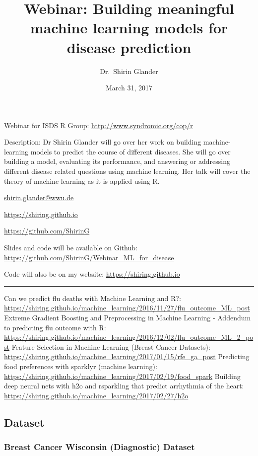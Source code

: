 \documentclass[]{article}
\title{Webinar: Building meaningful machine learning models for disease
prediction}
\author{Dr.~Shirin Glander}
\date{March 31, 2017}
\begin{document}
\maketitle

Webinar for ISDS R Group: \url{http://www.syndromic.org/cop/r}

Description: Dr Shirin Glander will go over her work on building
machine-learning models to predict the course of different diseases. She
will go over building a model, evaluating its performance, and answering
or addressing different disease related questions using machine
learning. Her talk will cover the theory of machine learning as it is
applied using R.

\href{mailto:shirin.glander@wwu.de}{shirin.glander@wwu.de}

\href{https://shiring.github.io}{https://shiring.github.io}

\href{https://github.com/ShirinG}{https://github.com/ShirinG}

Slides and code will be available on Github:
\href{https://github.com/ShirinG/Webinar_ML_for_disease}{https://github.com/ShirinG/Webinar\_ML\_for\_disease}

Code will also be on my website:
\href{https://shiring.github.io}{https://shiring.github.io}

\begin{center}\rule{0.5\linewidth}{\linethickness}\end{center}

Can we predict flu deaths with Machine Learning and R?:
\url{https://shiring.github.io/machine_learning/2016/11/27/flu_outcome_ML_post}
Extreme Gradient Boosting and Preprocessing in Machine Learning -
Addendum to predicting flu outcome with R:
\url{https://shiring.github.io/machine_learning/2016/12/02/flu_outcome_ML_2_post}
Feature Selection in Machine Learning (Breast Cancer Datasets):
\url{https://shiring.github.io/machine_learning/2017/01/15/rfe_ga_post}
Predicting food preferences with sparklyr (machine learning):
\url{https://shiring.github.io/machine_learning/2017/02/19/food_spark}
Building deep neural nets with h2o and rsparkling that predict
arrhythmia of the heart:
\url{https://shiring.github.io/machine_learning/2017/02/27/h2o}

\subsection{Dataset}\label{dataset}

\subsubsection{Breast Cancer Wisconsin (Diagnostic)
Dataset}\label{breast-cancer-wisconsin-diagnostic-dataset}
\end{document}
